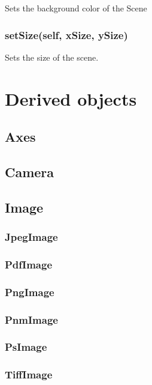 Sets the background color of the Scene

\subsubsection{setSize(self, xSize, ySize)}

Sets the size of the scene.

\section{Derived objects}

\subsection{Axes}

\subsection{Camera}

\subsection{Image}

\subsubsection{JpegImage}

\subsubsection{PdfImage}

\subsubsection{PngImage}

\subsubsection{PnmImage}

\subsubsection{PsImage}

\subsubsection{TiffImage}

